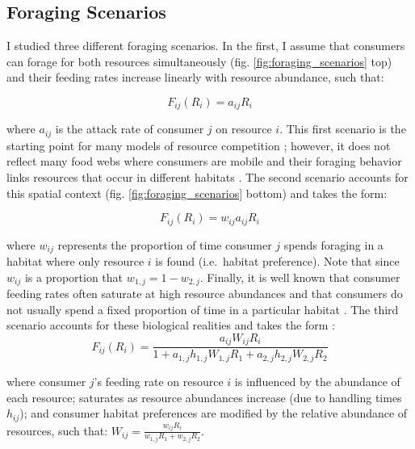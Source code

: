 \documentclass[11pt,]{article}
\begin{document}
\subsection{Foraging Scenarios}\label{foraging-scenarios}

I studied three different foraging scenarios. In the first, I assume
that consumers can forage for both resources simultaneously (fig.
\ref{fig:foraging_scenarios} top) and their feeding rates increase
linearly with resource abundance, such that:

\begin{equation} \label{eq:2}
  F_{ij}(R_i)=a_{ij}R_i
\end{equation}

where \(a_{ij}\) is the attack rate of consumer \(j\) on resource \(i\).
This first scenario is the starting point for many models of resource
competition \citep{MacArthur1972}; however, it does not reflect many
food webs where consumers are mobile and their foraging behavior links
resources that occur in different habitats \citep{McCann2005}. The
second scenario accounts for this spatial context (fig.
\ref{fig:foraging_scenarios} bottom) and takes the form:

\begin{equation} \label{eq:3}
  F_{ij}(R_i)=w_{ij}a_{ij}R_i
\end{equation}

where \(w_{ij}\) represents the proportion of time consumer \(j\) spends
foraging in a habitat where only resource \(i\) is found (i.e.~habitat
preference). Note that since \(w_{ij}\) is a proportion that
\(w_{1,j}=1-w_{2,j}\). Finally, it is well known that consumer feeding
rates often saturate at high resource abundances
\citep{Holling1959, Rosenzweig1963, Murdoch2003, McCann2011} and that
consumers do not usually spend a fixed proportion of time in a
particular habitat \citep{McCann2005}. The third scenario accounts for
these biological realities and takes the form \citep[derived
by][]{McCann2005}:\\

\begin{equation} \label{eq:4}
  F_{ij}(R_i)=\frac{a_{ij}W_{ij}R_i}{1+a_{1,j}h_{1,j}W_{1,j}R_1+a_{2,j}h_{2,j}W_{2,j}R_2}
\end{equation}

where consumer \(j\)'s feeding rate on resource \(i\) is influenced by
the abundance of each resource; saturates as resource abundances
increase (due to handling times \(h_{ij}\)); and consumer habitat
preferences are modified by the relative abundance of resources, such
that: \(W_{ij}=\frac{w_{ij}R_i}{w_{1,j}R_1+w_{2,j}R_2}\).
\end{document}
